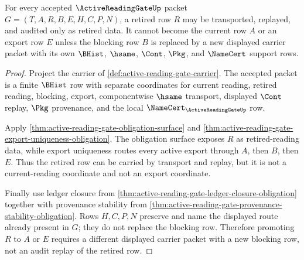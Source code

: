 \begin{theorem}
\label{thm:active-reading-gate-current-retired-boundary}
For every accepted $\ActiveReadingGateUp$ packet $G=(T,A,R,B,E,H,C,P,N)$, a retired row $R$ may be transported, replayed, and audited only as retired data. It cannot become the current row $A$ or an export row $E$ unless the blocking row $B$ is replaced by a new displayed carrier packet with its own $\BHist$, $\hsame$, $\Cont$, $\Pkg$, and $\NameCert$ support rows.
\end{theorem}
\begin{proof}
Project the carrier of \autoref{def:active-reading-gate-carrier}. The accepted packet is a finite $\BHist$ row with separate coordinates for current reading, retired reading, blocking, export, componentwise $\hsame$ transport, displayed $\Cont$ replay, $\Pkg$ provenance, and the local $\NameCert_{\ActiveReadingGateUp}$ row.

Apply \autoref{thm:active-reading-gate-obligation-surface} and \autoref{thm:active-reading-gate-export-uniqueness-obligation}. The obligation surface exposes $R$ as retired-reading data, while export uniqueness routes every active export through $A$, then $B$, then $E$. Thus the retired row can be carried by transport and replay, but it is not a current-reading coordinate and not an export coordinate.

Finally use ledger closure from \autoref{thm:active-reading-gate-ledger-closure-obligation} together with provenance stability from \autoref{thm:active-reading-gate-provenance-stability-obligation}. Rows $H,C,P,N$ preserve and name the displayed route already present in $G$; they do not replace the blocking row. Therefore promoting $R$ to $A$ or $E$ requires a different displayed carrier packet with a new blocking row, not an audit replay of the retired row.
\end{proof}

